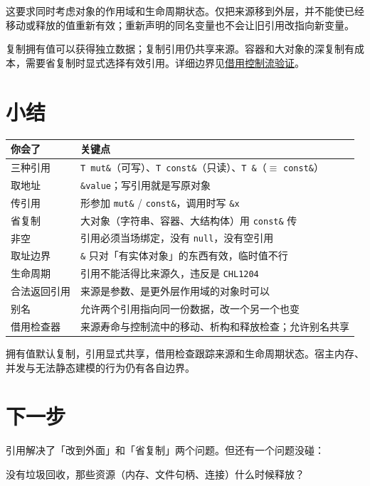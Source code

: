 这要求同时考虑对象的作用域和生命周期状态。仅把来源移到外层，并不能使已经移动或释放的值重新有效；重新声明的同名变量也不会让旧引用改指向新变量。

复制拥有值可以获得独立数据；复制引用仍共享来源。容器和大对象的深复制有成本，需要省复制时显式选择有效引用。详细边界见\href{https://gitee.com/rabbitc999/chali/blob/master/doc/11-algorithm-validation.md}{借用控制流验证}。

\section{小结}

\begin{center}
\begin{tabular}{ll}
\toprule
你会了 & 关键点 \\
\midrule
三种引用 & \texttt{T mut\&}（可写）、\texttt{T const\&}（只读）、\texttt{T \&}（\ensuremath{\equiv} \texttt{const\&}） \\
取地址 & \texttt{\&value}；写引用就是写原对象 \\
传引用 & 形参加 \texttt{mut\&} / \texttt{const\&}，调用时写 \texttt{\&x} \\
省复制 & 大对象（字符串、容器、大结构体）用 \texttt{const\&} 传 \\
非空 & 引用必须当场绑定，没有 \texttt{null}，没有空引用 \\
取址边界 & \texttt{\&} 只对「有实体对象」的东西有效，临时值不行 \\
生命周期 & 引用不能活得比来源久，违反是 \texttt{CHL1204} \\
合法返回引用 & 来源是参数、是更外层作用域的对象时可以 \\
别名 & 允许两个引用指向同一份数据，改一个另一个也变 \\
借用检查器 & 来源寿命与控制流中的移动、析构和释放检查；允许别名共享 \\
\bottomrule
\end{tabular}
\end{center}

拥有值默认复制，引用显式共享，借用检查跟踪来源和生命周期状态。宿主内存、并发与无法静态建模的行为仍有各自边界。

\section{下一步}

引用解决了「改到外面」和「省复制」两个问题。但还有一个问题没碰：

没有垃圾回收，那些资源（内存、文件句柄、连接）什么时候释放？

